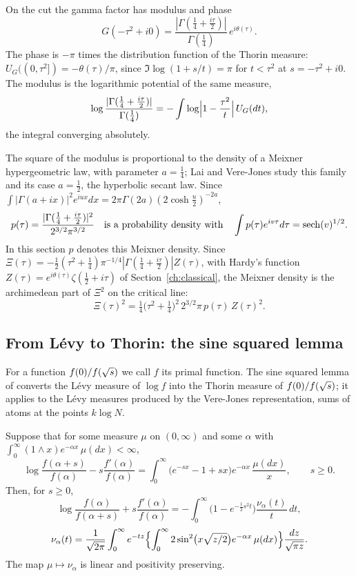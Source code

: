 On the cut the gamma factor has modulus and phase
\[
G(-\tau^2+i0)=\frac{|\Gamma(\frac14+\frac{i\tau}2)|}{\Gamma(\frac14)}\,e^{i\theta(\tau)} .
\]
The phase is $-\pi$ times the distribution function of the Thorin measure: $U_G((0,\tau^2])=-\theta(\tau)/\pi$, since $\Im\log(1+s/t)=\pi$ for $t<\tau^2$ at $s=-\tau^2+i0$. The modulus is the logarithmic potential of the same measure,
\begin{equation}\label{rz:eq:pot}
\log\frac{|\Gamma(\frac14+\frac{i\tau}2)|}{\Gamma(\frac14)}=-\int\log\Bigl|1-\frac{\tau^2}{t}\Bigr|\,U_G(dt),
\end{equation}
the integral converging absolutely.

The square of the modulus is proportional to the density of a Meixner hypergeometric law, with parameter $a=\frac14$; Lai and Vere-Jones \cite{LVJ} study this family and its case $a=\frac12$, the hyperbolic secant law. Since $\int|\Gamma(a+ix)|^2e^{iux}dx=2\pi\Gamma(2a)(2\cosh\frac u2)^{-2a}$,
\begin{equation}\label{rz:eq:meixner}
p(\tau)=\frac{|\Gamma(\frac14+\frac{i\tau}2)|^2}{2^{3/2}\pi^{3/2}}\quad\text{is a probability density with}\quad\int p(\tau)e^{iv\tau}d\tau=\operatorname{sech}(v)^{1/2}.
\end{equation}
In this section $p$ denotes this Meixner density. Since $\Xi(\tau)=-\frac12(\tau^2+\frac14)\pi^{-1/4}|\Gamma(\frac14+\frac{i\tau}2)|Z(\tau)$, with Hardy's function $Z(\tau)=e^{i\theta(\tau)}\zeta(\frac12+i\tau)$ of Section~\ref{ch:classical}, the Meixner density is the archimedean part of $\Xi^2$ on the critical line:
\[
\Xi(\tau)^2=\tfrac14\bigl(\tau^2+\tfrac14\bigr)^2\,2^{3/2}\pi\,p(\tau)\,Z(\tau)^2 .
\]


\subsection{From L\'evy to Thorin: the sine squared lemma}\label{rz:sec:sin2}

For a function $f(0)/f(\sqrt{s})$ we call $f$ its primal function. The sine squared lemma of \cite[Lemma 1]{P17v5} converts the L\'evy measure of $\log f$ into the Thorin measure of $f(0)/f(\sqrt{s})$; it applies to the L\'evy measures produced by the Vere-Jones representation, sums of atoms at the points $k\log N$.

\begin{lemma}[{\cite[Lemma 1]{P17v5}}]\label{rz:lem:P1}
Suppose that for some measure $\mu$ on $(0,\infty)$ and some $\alpha$ with $\int_0^\infty(1\wedge x)e^{-\alpha x}\,\mu(dx)<\infty$,
\[
\log\frac{f(\alpha+s)}{f(\alpha)}-s\frac{f'(\alpha)}{f(\alpha)}=\int_0^\infty\bigl(e^{-sx}-1+sx\bigr)e^{-\alpha x}\,\frac{\mu(dx)}x,\qquad s\ge0 .
\]
Then, for $s\ge0$,
\[
\log\frac{f(\alpha)}{f(\alpha+s)}+s\frac{f'(\alpha)}{f(\alpha)}=-\int_0^\infty\bigl(1-e^{-\frac12s^2t}\bigr)\frac{\nu_\alpha(t)}t\,dt,
\]
\[
\nu_\alpha(t)=\frac{1}{\sqrt{2\pi}}\int_0^\infty e^{-tz}\Bigl\{\int_0^\infty2\sin^2\bigl(x\sqrt{z/2}\bigr)e^{-\alpha x}\,\mu(dx)\Bigr\}\frac{dz}{\sqrt{\pi z}} .
\]
The map $\mu\mapsto\nu_\alpha$ is linear and positivity preserving.
\end{lemma}

